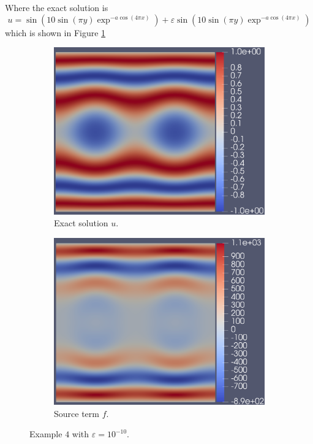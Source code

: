 \documentclass[12pt]{ociamthesis}
\begin{document}
Where the exact solution is 
\begin{equation}
u = \sin(10 \sin(\pi y) \exp^{-a\cos(4 \pi x)})  + \varepsilon \sin(10 \sin(\pi y) \exp^{-a\cos(4 \pi x)})
\end{equation}
which is shown in Figure \ref{E4_uf}

\begin{figure}[H]
 \begin{subfigure}{0.5\textwidth}
     \includegraphics[width=\textwidth]{Pics/uf/U_E4_eps_10.png}
     \caption{Exact solution $u$.}
 \end{subfigure}
   \begin{subfigure}{0.5\textwidth}
     \includegraphics[width=\textwidth]{Pics/uf/F_E4_eps_10.png}
     \caption{Source term $f$.}
 \end{subfigure}
 \caption{Example $4$ with $\varepsilon = 10^{-10}$.} \label{E4_uf}
\end{figure}
\end{document}
